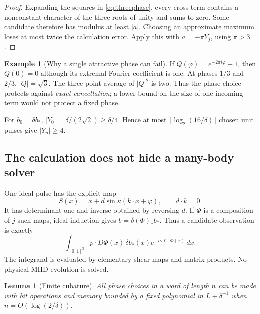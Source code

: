 \documentclass[11pt,a4paper]{amsart}
\newtheorem{lemma}[theorem]{Lemma}
\theoremstyle{definition}
\newtheorem{example}[theorem]{Example}
\theoremstyle{remark}
\numberwithin{equation}{section}
\newcommand{\push}[1]{(#1)_*}
\begin{document}
\begin{proof}
Expanding the squares in \eqref{eq:threephase}, every cross term contains a nonconstant character of the three roots of unity and sums to zero. Some candidate therefore has modulus at least $|a|$. Choosing an approximate maximum loses at most twice the calculation error. Apply this with $a=-\pi Y_j$, using $\pi>3$.
\end{proof}

\begin{example}[Why a single attractive phase can fail]\label{ex:cancellation}
If $Q(\varphi)=e^{-2\pi i\varphi}-1$, then $Q(0)=0$ although its extremal Fourier coefficient is one. At phases $1/3$ and $2/3$, $|Q|=\sqrt3$. The three-point average of $|Q|^2$ is two. Thus the phase choice protects against \emph{exact cancellation}; a lower bound on the size of one incoming term would not protect a fixed phase.
\end{example}

For $b_0=\delta b_*$, $|Y_0|=\delta/(2\sqrt2)\ge\delta/4$. Hence at most $\lceil\log_2(16/\delta)\rceil$ chosen unit pulses give $|Y_n|\ge4$.

\subsection{The calculation does not hide a many-body solver}
One ideal pulse has the explicit map
\begin{equation}\label{eq:shearmap}
 S(x)=x+d\sin\kappa(k\cdot x+\varphi),\qquad d\cdot k=0.
\end{equation}
It has determinant one and inverse obtained by reversing $d$. If $\Phi$ is a composition of $j$ such maps, ideal induction gives $b=\delta\push\Phi b_*$. Thus a candidate observation is exactly
\begin{equation}\label{eq:coefficientintegral}
 \int_{[0,1]^3}p\cdot D\Phi(x)\,\delta b_*(x)
 e^{-i\kappa\ell\cdot\Phi(x)}\,dx.
\end{equation}
The integrand is evaluated by elementary shear maps and matrix products. No physical MHD evolution is solved.

\begin{lemma}[Finite cubature]\label{lem:cubature}
All phase choices in a word of length $n$ can be made with bit operations and memory bounded by a fixed polynomial in $L+\delta^{-1}$ when $n=O(\log(2/\delta))$.
\end{lemma}
\end{document}
